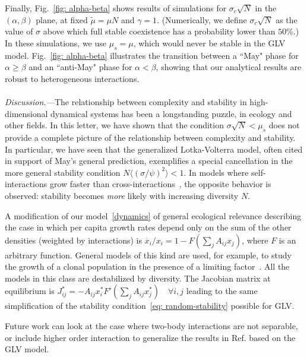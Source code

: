 \documentclass[
 prl,
 twocolumn,
 amsmath,
 amssymb,
 aps,
]{revtex4-2}
\begin{document}
Finally, Fig.~\ref{fig: alpha-beta} shows results of simulations for $\sigma_c\sqrt{N}$ in the $(\alpha,\beta)$ plane, at fixed $\tilde{\mu}=\mu N$ and $\gamma = 1$. (Numerically, we define $\sigma_c\sqrt{N}$ as the value of $\sigma$ above which full stable coexistence has a probability lower than $50\%$.) In these simulations, we use $\mu_s = \mu$, which would never be stable in the GLV model. Fig.~\ref{fig: alpha-beta} illustrates the transition between a ``May" phase for $\alpha \geq \beta$ and an ``anti-May" phase for $\alpha < \beta$, showing that our analytical results are robust to heterogeneous interactions.

\paragraph*{}
\emph{Discussion.---}The relationship between complexity and stability in high-dimensional dynamical systems has been a longstanding puzzle, in ecology and other fields. 
In this letter, we have shown that the condition $\sigma\sqrt{N}< \mu_s$ does not provide a complete picture of the relationship between complexity and stability. 
In particular, we have seen that the generalized Lotka-Volterra model, often cited in support of May's general prediction, exemplifies a special cancellation in the more general stability condition $N\langle (\sigma/\psi)^2\rangle < 1$.
In models where self-interactions grow faster than cross-interactions~\cite{Hatton2024,samadder2024interconnection}, the opposite behavior is observed: stability becomes \emph{more} likely with increasing diversity $N$.

A modification of our model~\eqref{dynamics} of general ecological relevance describing the case in which per capita growth rates depend only on the sum of the other densities (weighted by interactions) is $\dot{x_i}/x_i=1-F(\sum_jA_{ij}x_j)$, where $F$ is an arbitrary function.
General models of this kind are used, for example, to study the growth of a clonal population in the presence of a limiting factor~\cite{mazzolini2023universality}.
All the models in this class are destabilized by diversity.
The Jacobian matrix at equilibrium is $J_{ij}^*=-A_{ij}x_i^*F'(\sum_jA_{ij}x_j^*) \quad \forall i,j$ leading to the same simplification of the stability condition~\eqref{eq: random-stability} possible for GLV.

Future work can look at the case where two-body interactions are not separable, or include higher order interaction to generalize the results in Ref. \cite{Gibbs2022} based on the GLV model. 
\end{document}

